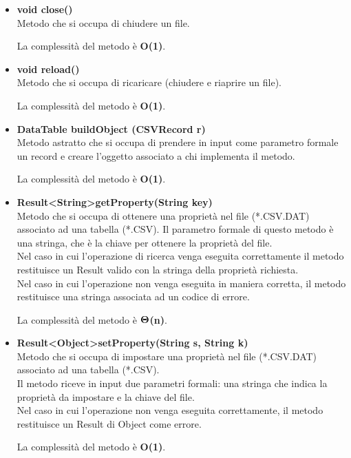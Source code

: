 \documentclass[a4paper, 12pt]{scrreprt}
\begin{document}
			\begin{itemize}
				\item \textbf{void close()}
				\\Metodo che si occupa di chiudere un file.
				
				La complessit\`a del metodo è \textbf{O(1)}.
				
				\item \textbf{void reload()}
				\\Metodo che si occupa di ricaricare (chiudere e riaprire un file).
				
				La complessit\`a del metodo è \textbf{O(1)}.

				\item \textbf {DataTable buildObject (CSVRecord r)}
				\\Metodo astratto che si occupa di prendere in input come parametro formale un record e creare l'oggetto associato a chi implementa il metodo.
				
				La complessit\`a del metodo è \textbf{O(1)}.

				\item \textbf{Result\textless String\textgreater getProperty(String key)}
				\\Metodo che si occupa di ottenere una propriet\`a nel file (*.CSV.DAT) associato ad una tabella (*.CSV). Il parametro formale di questo metodo \`e una stringa, che \`e la chiave per ottenere la propriet\`a del file.
				\\Nel caso in cui l'operazione di ricerca venga eseguita correttamente il metodo restituisce un Result valido con la stringa della propriet\`a richiesta.
				\\Nel caso in cui l'operazione non venga eseguita in maniera corretta, il metodo restituisce una stringa associata ad un codice di errore.
				
				La complessit\`a del metodo \`e $\mathbf{\Theta}$\textbf{(n)}.

				\item  \textbf{Result\textless Object\textgreater setProperty(String s, String k)}
				\\Metodo che si occupa di impostare una propriet\`a nel file (*.CSV.DAT) associato ad una tabella (*.CSV).
				\\Il metodo riceve in input due parametri formali: una stringa che indica la propriet\`a da impostare e la chiave del file.
				\\Nel caso in cui l'operazione non venga eseguita correttamente, il metodo restituisce un Result di Object come errore.
				
				La complessit\`a del metodo è \textbf{O(1)}.
				
			\end{itemize}
\end{document}
